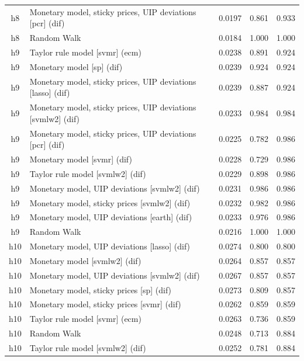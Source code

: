 \begin{ThreePartTable}
\begin{longtable}[t]{cp{5.5cm}ccc}
h8 & \raggedright Monetary model, sticky prices, UIP deviations [pcr] (dif) & 0.0197 & 0.861 & 0.933\\
h8 & \raggedright Random Walk & 0.0184 & 1.000 & 1.000\\
\addlinespace
h9 & \raggedright Taylor rule model [svmr] (ecm) & 0.0238 & 0.891 & 0.924\\
h9 & \raggedright Monetary model [sp] (dif) & 0.0239 & 0.924 & 0.924\\
h9 & \raggedright Monetary model, sticky prices, UIP deviations [lasso] (dif) & 0.0239 & 0.887 & 0.924\\
h9 & \raggedright Monetary model, sticky prices, UIP deviations [svmlw2] (dif) & 0.0233 & 0.984 & 0.984\\
h9 & \raggedright Monetary model, sticky prices, UIP deviations [pcr] (dif) & 0.0225 & 0.782 & 0.986\\
h9 & \raggedright Monetary model [svmr] (dif) & 0.0228 & 0.729 & 0.986\\
h9 & \raggedright Taylor rule model [svmlw2] (dif) & 0.0229 & 0.898 & 0.986\\
h9 & \raggedright Monetary model, UIP deviations [svmlw2] (dif) & 0.0231 & 0.986 & 0.986\\
h9 & \raggedright Monetary model, sticky prices [svmlw2] (dif) & 0.0232 & 0.982 & 0.986\\
h9 & \raggedright Monetary model, UIP deviations [earth] (dif) & 0.0233 & 0.976 & 0.986\\
h9 & \raggedright Random Walk & 0.0216 & 1.000 & 1.000\\
\addlinespace
h10 & \raggedright Monetary model, UIP deviations [lasso] (dif) & 0.0274 & 0.800 & 0.800\\
h10 & \raggedright Monetary model [svmlw2] (dif) & 0.0264 & 0.857 & 0.857\\
h10 & \raggedright Monetary model, UIP deviations [svmlw2] (dif) & 0.0267 & 0.857 & 0.857\\
h10 & \raggedright Monetary model, sticky prices [sp] (dif) & 0.0273 & 0.809 & 0.857\\
h10 & \raggedright Monetary model, sticky prices [svmr] (dif) & 0.0262 & 0.859 & 0.859\\
h10 & \raggedright Taylor rule model [svmr] (ecm) & 0.0263 & 0.736 & 0.859\\
h10 & \raggedright Random Walk & 0.0248 & 0.713 & 0.884\\
h10 & \raggedright Taylor rule model [svmlw2] (dif) & 0.0252 & 0.781 & 0.884\\

\end{longtable}
\end{ThreePartTable}
